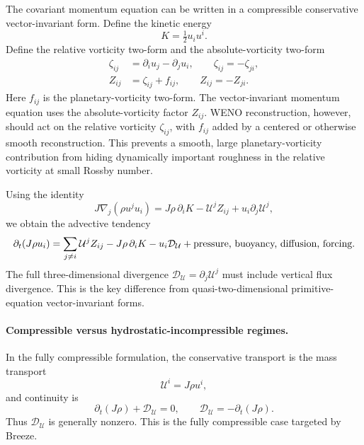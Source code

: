 \documentclass[11pt]{article}
\newcommand{\pd}{\partial}
\newcommand{\half}{\tfrac{1}{2}}
\newcommand{\mc}[1]{\mathcal{#1}}
\newcommand{\Div}{\mc{D}}
\newcommand{\Uflux}{\mc{U}}
\newcommand{\Dmass}{\Div_{\Uflux}}
\begin{document}
The covariant momentum equation can be written in a compressible conservative vector-invariant form.  Define the kinetic energy
\begin{equation}
  K = \half u_i u^i.
\end{equation}
Define the relative vorticity two-form and the absolute-vorticity two-form
\begin{align}
  \zeta_{ij} &= \pd_i u_j - \pd_j u_i,
  \qquad \zeta_{ij}=-\zeta_{ji}, \\
  Z_{ij} &= \zeta_{ij} + f_{ij},
  \qquad Z_{ij}=-Z_{ji}.
  \label{eq:vorticity-two-form}
\end{align}
Here \(f_{ij}\) is the planetary-vorticity two-form.  The vector-invariant momentum equation uses the absolute-vorticity factor \(Z_{ij}\).  WENO reconstruction, however, should act on the relative vorticity \(\zeta_{ij}\), with \(f_{ij}\) added by a centered or otherwise smooth reconstruction.  This prevents a smooth, large planetary-vorticity contribution from hiding dynamically important roughness in the relative vorticity at small Rossby number.

Using the identity
\begin{equation}
  J\nabla_j(\rho u^j u_i)
  = J\rho\,\pd_i K - \Uflux^j Z_{ij} + u_i\pd_j \Uflux^j,
  \label{eq:compressible-vi-identity}
\end{equation}
we obtain the advective tendency
\begin{equation}
  \pd_t(J\rho u_i)
  = \sum_{j\ne i} \Uflux^j Z_{ij}
  - J\rho\,\pd_i K
  - u_i \Dmass
  + \hbox{pressure, buoyancy, diffusion, forcing}.
  \label{eq:vi-tendency}
\end{equation}
The full three-dimensional divergence \(\Dmass=\pd_j\Uflux^j\) must include vertical flux divergence.  This is the key difference from quasi-two-dimensional primitive-equation vector-invariant forms.

\paragraph{Compressible versus hydrostatic-incompressible regimes.}
In the fully compressible formulation, the conservative transport is the mass transport
\begin{equation}
  \Uflux^i = J\rho u^i,
\end{equation}
and continuity is
\begin{equation}
  \pd_t(J\rho) + \Dmass = 0,
  \qquad
  \Dmass = -\pd_t(J\rho).
\end{equation}
Thus \(\Dmass\) is generally nonzero.  This is the fully compressible case targeted by Breeze.
\end{document}
